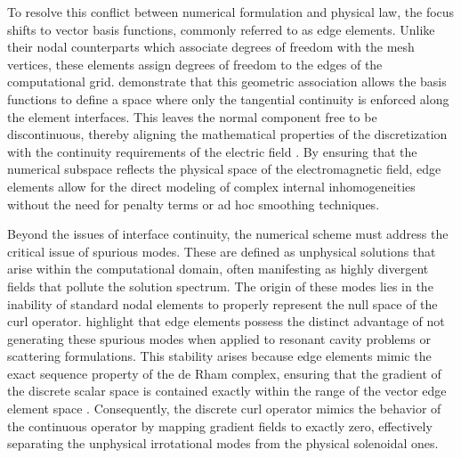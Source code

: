\documentclass[class=report, crop=false]{standalone}
\begin{document}
\vspace{12pt}

To resolve this conflict between numerical formulation and physical law, the focus shifts to vector basis functions, commonly referred to as edge elements. Unlike their nodal counterparts which associate degrees of freedom with the mesh vertices, these elements assign degrees of freedom to the edges of the computational grid. \citet{Bossavit1989} demonstrate that this geometric association allows the basis functions to define a space where only the tangential continuity is enforced along the element interfaces. This leaves the normal component free to be discontinuous, thereby aligning the mathematical properties of the discretization with the continuity requirements of the electric field \citep{Kamireddy2022}. By ensuring that the numerical subspace reflects the physical space of the electromagnetic field, edge elements allow for the direct modeling of complex internal inhomogeneities without the need for penalty terms or ad hoc smoothing techniques.

\vspace{12pt}

Beyond the issues of interface continuity, the numerical scheme must address the critical issue of spurious modes. These are defined as unphysical solutions that arise within the computational domain, often manifesting as highly divergent fields that pollute the solution spectrum. The origin of these modes lies in the inability of standard nodal elements to properly represent the null space of the curl operator. \citet{Bossavit1989} highlight that edge elements possess the distinct advantage of not generating these spurious modes when applied to resonant cavity problems or scattering formulations. This stability arises because edge elements mimic the exact sequence property of the de Rham complex, ensuring that the gradient of the discrete scalar space is contained exactly within the range of the vector edge element space \citep{Schwarzbach2009}. Consequently, the discrete curl operator mimics the behavior of the continuous operator by mapping gradient fields to exactly zero, effectively separating the unphysical irrotational modes from the physical solenoidal ones.

\vspace{12pt}
\end{document}
